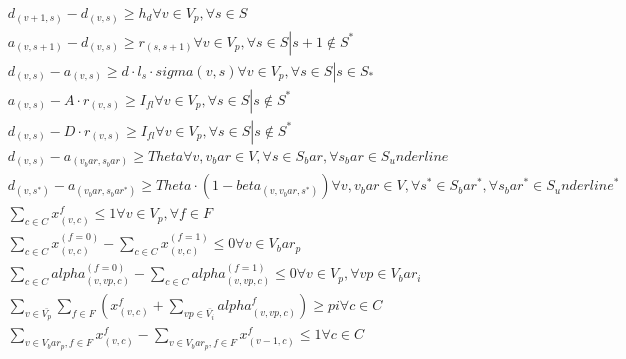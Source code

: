 \begin{align}
  & d_{\left(v + 1 , s\right)} - d_{\left(v , s\right)} \geq h_{d} \forall v \in V_{p} , \forall s \in S \tag{eq\_0003} \\
  & a_{\left(v , s + 1\right)} - d_{\left(v , s\right)} \geq r_{\left(s , s + 1\right)} \forall v \in V_{p} , \forall s \in S \left|\right. s + 1 \notin S^{*} \tag{eq\_0004} \\
  & d_{\left(v , s\right)} - a_{\left(v , s\right)} \geq d \cdot l_{s} \cdot \mathit{sigma} \left(v , s\right) \forall v \in V_{p} , \forall s \in S \left|\right. s \in S_{*} \tag{eq\_0005} \\
  & a_{\left(v , s\right)} - A \cdot r_{\left(v , s\right)} \geq I_{f l} \forall v \in V_{p} , \forall s \in S \left|\right. s \notin S^{*} \tag{eq\_0006} \\
  & d_{\left(v , s\right)} - D \cdot r_{\left(v , s\right)} \geq I_{f l} \forall v \in V_{p} , \forall s \in S \left|\right. s \notin S^{*} \tag{eq\_0008} \\
  & d_{\left(v , s\right)} - a_{\left(v_bar , s_bar\right)} \geq \mathit{Theta} \forall v , v_bar \in V , \forall s \in S_bar , \forall s_bar \in S_underline \tag{eq\_0009} \\
  & d_{\left(v , s^{*}\right)} - a_{\left(v_bar , s_bar^{*}\right)} \geq \mathit{Theta} \cdot \left(1 - \mathit{beta}_{\left(v , v_bar , s^{*}\right)}\right) \forall v , v_bar \in V , \forall s^{*} \in S_bar^{*} , \forall s_bar^{*} \in S_underline^{*} \tag{eq\_0010} \\
  & \sum_{c \in C} x_{\left(v , c\right)}^{f} \leq 1 \forall v \in V_{p} , \forall f \in F \tag{eq\_0011} \\
  & \sum_{c \in C} x_{\left(v , c\right)}^{\left(f = 0\right)} - \sum_{c \in C} x_{\left(v , c\right)}^{\left(f = 1\right)} \leq 0 \forall v \in V_bar_{p} \tag{eq\_0012} \\
  & \sum_{c \in C} \mathit{alpha}_{\left(v , vp , c\right)}^{\left(f = 0\right)} - \sum_{c \in C} \mathit{alpha}_{\left(v , vp , c\right)}^{\left(f = 1\right)} \leq 0 \forall v \in V_{p} , \forall vp \in V_bar_{i} \tag{eq\_0013} \\
  & \underset{v \in \bar{V_{p}}}{\sum} \sum_{f \in F} \left(x_{\left(v , c\right)}^{f} + \underset{vp \in \bar{V_{i}}}{\sum} \mathit{alpha}_{\left(v , vp , c\right)}^{f}\right) \geq \mathit{pi} \forall c \in C \tag{eq\_0014} \\
  & \sum_{v \in V_bar_{p}, f \in F} x_{\left(v , c\right)}^{f} - \sum_{v \in V_bar_{p}, f \in F} x_{\left(v - 1 , c\right)}^{f} \leq 1 \forall c \in C \tag{eq\_0015} \\

\end{align}
